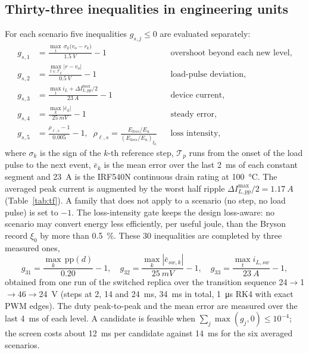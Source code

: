 \subsection{Thirty-three inequalities in engineering units}
For each scenario five inequalities $g_{s,j}\le0$ are evaluated separately:
\begin{equation}
\begin{aligned}
g_{s,1}&=\frac{\max_t\,\sigma_k\big(v_o-r_k\big)}{\SI{1.5}{V}}-1 &&\text{overshoot beyond each new level},\\
g_{s,2}&=\frac{\max_{t\in\mathcal T_p}|r-v_o|}{\SI{0.5}{V}}-1 &&\text{load-pulse deviation},\\
g_{s,3}&=\frac{\max_t i_L+\Delta I_{L,pp}^{\max}/2}{\SI{23}{A}}-1 &&\text{device current},\\
g_{s,4}&=\frac{\max_k|\bar e_k|}{\SI{25}{mV}}-1 &&\text{steady error},\\
g_{s,5}&=\frac{\rho_{\ell,s}-1}{0.005}-1,\;\; \rho_{\ell,s}=\frac{E_{loss}/E_u}{(E_{loss}/E_u)_{\xi_0}} &&\text{loss intensity},
\end{aligned}
\label{eq:g}
\end{equation}
where $\sigma_k$ is the sign of the $k$-th reference step, $\mathcal T_p$ runs from
the onset of the load pulse to the next event, $\bar e_k$ is the mean error over
the last \SI{2}{ms} of each constant segment and \SI{23}{A} is the IRF540N
continuous drain rating at \SI{100}{\celsius}. The averaged peak current is
augmented by the worst half ripple $\Delta I_{L,pp}^{\max}/2=\SI{1.17}{A}$
(Table~\ref{tab:tf}). A family that does not apply to a scenario (no step, no
load pulse) is set to $-1$. The loss-intensity gate keeps the design
loss-aware: no scenario may convert energy less efficiently, per useful joule,
than the Bryson record $\xi_0$ by more than \SI{0.5}{\percent}.
These 30 inequalities are completed by three measured ones,
\begin{equation}
g_{31}=\frac{\max_{k}\,\mathrm{pp}(d)}{0.20}-1,\quad
g_{32}=\frac{\max_{k}|\bar e_{sw,k}|}{\SI{25}{mV}}-1,\quad
g_{33}=\frac{\max_t i_{L,sw}}{\SI{23}{A}}-1,
\label{eq:gsw}
\end{equation}
obtained from one run of the switched replica over the transition sequence
24$\to$1$\to$46$\to$24~V (steps at 2, 14 and \SI{24}{ms}, \SI{34}{ms} in total,
\SI{1}{\micro s} RK4 with exact PWM edges). The duty peak-to-peak and the mean
error are measured over the last \SI{4}{ms} of each level. A candidate is
feasible when $\sum_j\max(g_j,0)\le10^{-4}$; the screen costs about \SI{12}{ms}
per candidate against \SI{14}{ms} for the six averaged scenarios.


